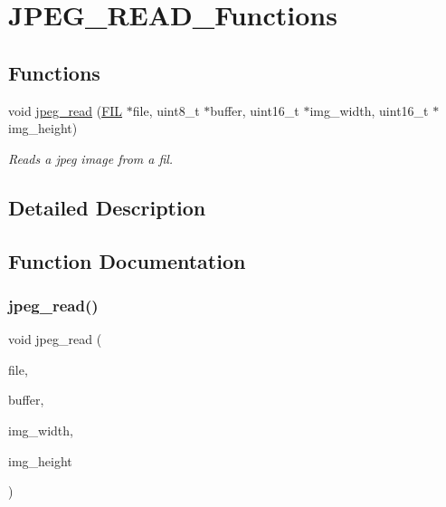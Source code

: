 \hypertarget{group___j_p_e_g___r_e_a_d___functions}{}\section{J\+P\+E\+G\+\_\+\+R\+E\+A\+D\+\_\+\+Functions}
\label{group___j_p_e_g___r_e_a_d___functions}
\subsection*{Functions}
\begin{DoxyCompactItemize}
\item 
void \hyperlink{group___j_p_e_g___r_e_a_d___functions_gacd81d8ed57ccef1211a3aebfe2b9544b}{jpeg\+\_\+read} (\hyperlink{struct_f_i_l}{F\+IL} $\ast$file, uint8\+\_\+t $\ast$buffer, uint16\+\_\+t $\ast$img\+\_\+width, uint16\+\_\+t $\ast$img\+\_\+height)
\begin{DoxyCompactList}\small\item\em Reads a jpeg image from a fil. \end{DoxyCompactList}\end{DoxyCompactItemize}


\subsection{Detailed Description}


\subsection{Function Documentation}
\mbox{\label{group___j_p_e_g___r_e_a_d___functions_gacd81d8ed57ccef1211a3aebfe2b9544b}} 
\subsubsection{\texorpdfstring{jpeg\+\_\+read()}{jpeg\_read()}}
{\footnotesize\ttfamily void jpeg\+\_\+read (\begin{DoxyParamCaption}\item[{\hyperlink{struct_f_i_l}{F\+IL} $\ast$}]{file,  }\item[{uint8\+\_\+t $\ast$}]{buffer,  }\item[{uint16\+\_\+t $\ast$}]{img\+\_\+width,  }\item[{uint16\+\_\+t $\ast$}]{img\+\_\+height }\end{DoxyParamCaption})}



